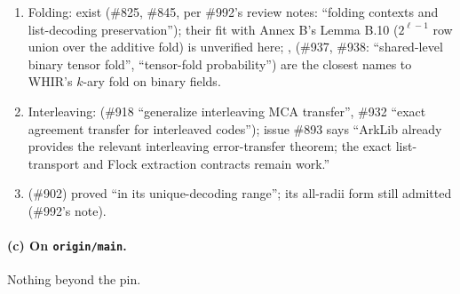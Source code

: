 \begin{itemize}
\begin{enumerate}
    , , ), proved --- Annex B's
    Johnson bound $L_i = 1/(2\eta_i\sqrt{\rho_i})$ (obligation node 2.1.2.4.2) has a proved
    upstream source, in the ``pairwise'' integral form $n(A-D)/(A^2-nD)$; the exact form used
    by Annex B is to be derived.
  \item Folding: 
    exist (\#825, \#845, per \#992's review notes: ``folding contexts and list-decoding
    preservation''); their fit with Annex B's Lemma B.10 ($2^{\ell-1}$ row union over the
    additive fold) is unverified here; ,
     (\#937, \#938: ``shared-level binary tensor fold'',
    ``tensor-fold probability'') are the closest names to WHIR's $k$-ary fold on binary fields.
  \item Interleaving:  (\#918 ``generalize
    interleaving MCA transfer'', \#932 ``exact agreement transfer for interleaved codes''); issue
    \#893 says ``ArkLib already provides the relevant interleaving error-transfer theorem; the
    exact list-transport and Flock extraction contracts remain work.''
  \item {} (\#902) proved ``in its unique-decoding range'';
    its all-radii form still admitted (\#992's note).
  \end{enumerate}
\end{itemize}

\paragraph{(c) On \texttt{origin/main}.}
Nothing beyond the pin.

